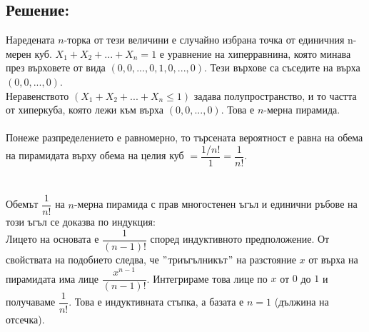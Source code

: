 \documentclass[french]{article}
\begin{document}
	\subsection*{Решение:}	
	Наредената $n$-торка от тези величини е случайно избрана точка от единичния n-мерен куб. $X_1 + X_2 + ... + X_n = 1$ е уравнение на хиперравнина, която минава през върховете от вида $(0, 0, ..., 0, 1, 0, ..., 0)$. Тези върхове са съседите на върха $(0, 0, ..., 0)$. \\
	Неравенството $(X_1 + X_2 + ... + X_n \le 1)$ задава полупространство, и то частта от хиперкуба, която лежи към върха $(0, 0, ..., 0)$.
	Това е $n$-мерна пирамида. \\ \\
	Понеже разпределението е равномерно, то търсената вероятност е равна на
	обема на пирамидата върху обема на целия куб $= \dfrac{1/n!}{1} = \dfrac{1}{n!}$. \\
	\\
	\\
	Обемът $\dfrac{1}{n!}$ на $n$-мерна пирамида с прав многостенен ъгъл и единични ръбове на този ъгъл се доказва по индукция: \\
	Лицето на основата е $\dfrac{1}{(n-1)!}$ според индуктивното предположение. От свойствата на подобието следва, че $"$триъгълникът$"$ на разстояние $x$ от върха на пирамидата има лице $\dfrac{x^{n-1}}{(n-1)!}$. Интегрираме това лице по $x$ от $0$ до $1$ и получаваме $\dfrac{1}{n!}$.
	Това е индуктивната стъпка, а базата е $n = 1$ (дължина на отсечка).
\end{document}
